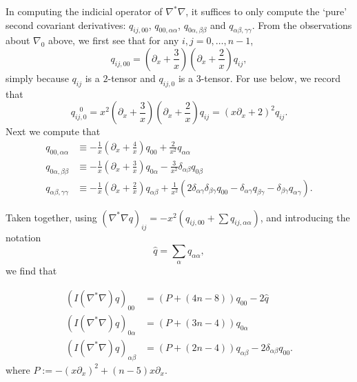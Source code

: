 \documentclass[10pt,reqno]{amsart}
\newcommand{\del}{\partial}
\begin{document}
In computing the indicial operator of $\nabla^* \nabla$, it suffices to only compute the `pure' second covariant derivatives:
$q_{ij,00}$, $q_{00, \alpha \alpha}$, $q_{0\alpha, \beta \beta}$ and $q_{\alpha \beta, \gamma \gamma}$.  From the observations about $\nabla_0$ above, we first see
that for any $i, j = 0, \ldots, n-1$, 
\[
q_{ij, 00} = ( \del_x + \frac{3}{x}) (\del_x + \frac{2}{x}) q_{ij},
\]
simply because $q_{ij}$ is a $2$-tensor and $q_{ij,0}$ is a $3$-tensor.    For use below, we record that
\[
q_{ij,0}^{\ \ \  0} = x^2 (\del_x + \frac{3}{x})(\del_x + \frac{2}{x}) q_{ij}= (x\del_x + 2)^2 q_{ij}.
\]
Next we compute that
\begin{align*}
q_{00, \alpha \alpha} & \equiv - \frac{1}{x} (\del_x + \frac{4}{x}) q_{00} + \frac{2}{x^2} q_{\alpha \alpha}  \\
q_{0\alpha, \beta \beta} & \equiv -\frac{1}{x}( \del_x + \frac{3}{x})q_{0\alpha} - \frac{3}{x^2}\delta_{\alpha \beta} q_{0 \beta} \\
q_{\alpha \beta, \gamma \gamma} & \equiv -\frac{1}{x} (\del_x + \frac{2}{x}) q_{\alpha \beta} + \frac{1}{x^2} ( 2 \delta_{\alpha \gamma} \delta_{\beta \gamma} q_{00}
- \delta_{\alpha \gamma} q_{\beta \gamma} - \delta_{\beta \gamma} q_{\alpha \gamma} ).
\end{align*}

Taken together, using $(\nabla^* \nabla q)_{ij} = - x^2 ( q_{ij,00} + \sum q_{ij, \alpha \alpha})$, and introducing the notation
\[
\hat{q} = \sum_\alpha q_{\alpha \alpha},
\]
we find that 

\begin{align*}
(I(\nabla^* \nabla) q)_{00} & = (P + (4n-8)) q_{00} - 2 \hat{q}  \\
(I(\nabla^*\nabla)q)_{0\alpha} & = (P + (3n-4)) q_{0\alpha} \\
(I(\nabla^* \nabla) q)_{\alpha \beta} & = (P + (2n-4)) q_{\alpha \beta} - 2 \delta_{\alpha\beta} q_{00}.
\end{align*}
where $P := - (x\del_x)^2 + (n-5) x\del_x$.

\
\end{document}

